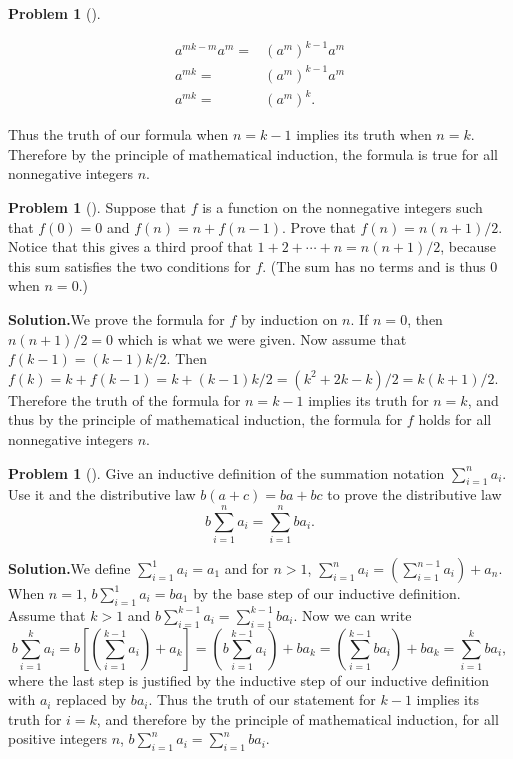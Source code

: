 \documentclass[10pt,]{book}
\theoremstyle{plain}
\theoremstyle{definition}
\newtheorem{activity}[project]{Problem}
\theoremstyle{definition}
\numberwithin{equation}{chapter}
\newcommand{\amp}{&}
\begin{document}
\begin{activity}[]
\begin{enumerate}[font=\bfseries,label=(\alph*),ref=\alph*]
\begin{align*}
a^{mk-m}a^m =\amp (a^m)^{k-1}a^m\\
a^{mk} =\amp (a^m)^{k-1}a^m\\
a^{mk} =\amp (a^m)^k.
\end{align*}
%
\par
Thus the truth of our formula when \(n=k-1\) implies its truth when \(n=k\). Therefore by the principle of mathematical induction, the formula is true for all nonnegative integers \(n\).%
\end{enumerate}
\end{activity}
\begin{activity}[]\label{activity-77}
Suppose that \(f\) is a function on the nonnegative integers such that \(f(0)=0\) and \(f(n) = n+f(n-1)\). Prove that \(f(n) = n(n+1)/2\). Notice that this gives a third proof that \(1+2+\cdots+n=n(n+1)/2\), because this sum satisfies the two conditions for \(f\). (The sum has no terms and is thus 0 when \(n=0\).)%
\par\medskip\noindent%
\textbf{Solution.}\quad We prove the formula for \(f\) by induction on \(n\). If \(n=0\), then \(n(n+1)/2=0\) which is what we were given. Now assume that \(f(k-1)=
(k-1)k/2\). Then \(f(k)= k+f(k-1)= k+(k-1)k/2=(k^2+2k-k)/2=k(k+1)/2\). Therefore the truth of the formula for \(n=k-1\) implies its truth for \(n=k\), and thus by the principle of mathematical induction, the formula for \(f\) holds for all nonnegative integers \(n\).%
\end{activity}
\begin{activity}[]\label{activity-78}
Give an inductive definition of the summation notation \(\sum_{i=1}^n a_i\). Use it and the distributive law \(b(a+c) = ba+bc\) to prove the distributive law%
\begin{equation*}
b\sum_{i=1}^n a_i = \sum_{i=1}^n ba_i.
\end{equation*}
%
\par\medskip\noindent%
\textbf{Solution.}\quad We define \(\sum_{i=1}^1a_i = a_1\) and for \(n>1\), \(\sum_{i=1}^n
a_i =  \left(\sum_{i=1}^{n-1}a_i\right) +a_n\). When \(n=1\), \(b\sum_{i=1}^1a_i =ba_1\) by the base step of our inductive definition. Assume that \(k>1\) and \(b\sum_{i=1}^{k-1}a_i=\sum_{i=1}^{k-1}ba_i\). Now we can write%
\begin{equation*}
b\sum_{i=1}^k a_i\!=\! b\left[\left(\sum_{i=1}^{k-1}a_i\right)+a_k\right]
\!=\!
\left(b\sum_{i=1}^{k-1}a_i\right) +ba_k \!=\! \left(\sum_{i=1}^{k-1}ba_i\right)
+ ba_k \!=\! \sum_{i=1}^k ba_i,
\end{equation*}
where the last step is justified by the inductive step of our inductive definition with \(a_i\) replaced by \(ba_i\). Thus the truth of our statement for \(k-1\) implies its truth for \(i=k\), and therefore by the principle of mathematical induction, for all positive integers \(n\), \(b\sum_{i=1}^na_i= \sum_{i=1}^nba_i\).%
\end{activity}
\typeout{************************************************}
\typeout{************************************************}
\end{document}
